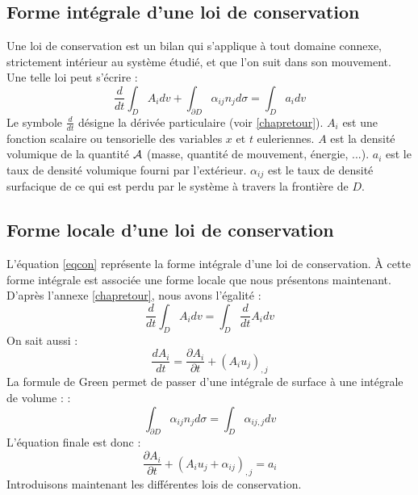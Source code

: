 \documentclass[12pt]{book}
\begin{document}
\subsection{Forme int\'egrale d'une loi de conservation}
Une loi de conservation est un bilan qui
s'applique \`a tout domaine 
connexe, strictement int\'erieur au syst\`eme \'etudi\'e, et que l'on
suit dans son mouvement. Une telle  loi peut s'\'ecrire :
\begin{equation}
\frac{d}{dt}\int_D A_idv+\int_{\partial D} \alpha_{ij}
n_jd\sigma=\int_D a_idv \label{eqcon}
\end{equation}
Le symbole $\frac{d}{dt}$ d\'esigne la d\'eriv\'ee particulaire
(voir \ref{chapretour}).
$A_i$ est une fonction scalaire ou tensorielle des variables $x$ et $t$
euleriennes. $A$ est la densit\'e volumique de la quantit\'e ${\cal
A}$ (masse, quantit\'e de mouvement, \'energie, ...). $a_i$ est le 
taux de densit\'e volumique fourni par l'ext\'erieur. $\alpha_{ij}$ est
le taux de densit\'e surfacique de ce qui est perdu par le syst\`eme
\`a travers la fronti\`ere de $D$.
\subsection{Forme locale d'une loi de conservation}
L'\'equation \ref{eqcon} repr\'esente la forme int\'egrale d'une loi de
conservation. \`A cette forme int\'egrale est associ\'ee une forme
locale que nous pr\'esentons maintenant.
D'apr\`es l'annexe \ref{chapretour}, nous avons l'\'egalit\'e : 
\begin{equation}
\frac{d}{dt}\int_D A_idv=\int_D \frac{d}{dt} A_idv
\end{equation}
On sait aussi :
\begin{equation}
\frac{dA_i}{dt}=\frac{\partial A_i}{\partial t}+(A_iu_j)_{,j}
\end{equation}
La formule de Green permet de passer d'une int\'egrale de surface \`a
une int\'egrale de volume : :
\begin{equation}
\int_{\partial D} \alpha_{ij}n_jd\sigma=\int_{D} \alpha_{ij,j}dv
\end{equation}
L'\'equation finale est donc :
\begin{equation}
\frac{\partial A_i}{\partial t}+(A_iu_j+\alpha_{ij})_{,j}=a_i
\end{equation}
Introduisons maintenant les diff\'erentes lois de conservation. 
\end{document}

